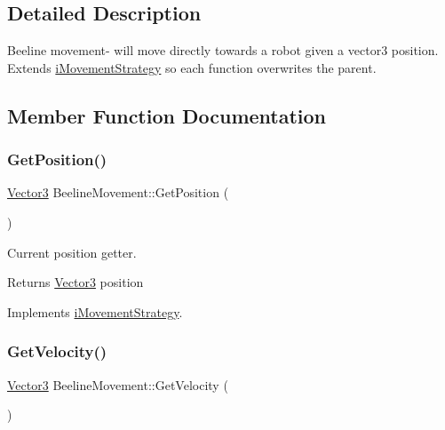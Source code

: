 \subsection{Detailed Description}
Beeline movement-\/ will move directly towards a robot given a vector3 position. Extends \hyperlink{classiMovementStrategy}{i\+Movement\+Strategy} so each function overwrites the parent. 

\subsection{Member Function Documentation}
\mbox{\label{classBeelineMovement_abfe070233bcdba668cd6f445b149f310}} 
\subsubsection{\texorpdfstring{Get\+Position()}{GetPosition()}}
{\footnotesize\ttfamily \hyperlink{classVector3}{Vector3} Beeline\+Movement\+::\+Get\+Position (\begin{DoxyParamCaption}{ }\end{DoxyParamCaption})\hspace{0.3cm}{\ttfamily [virtual]}}



Current position getter. 

\begin{DoxyReturn}{Returns}
\hyperlink{classVector3}{Vector3} position 
\end{DoxyReturn}


Implements \hyperlink{classiMovementStrategy_aa9f5a07461c654a7497775696d20e990}{i\+Movement\+Strategy}.

\mbox{\label{classBeelineMovement_a20adc01dabe57edd17128b81ec49661a}} 
\subsubsection{\texorpdfstring{Get\+Velocity()}{GetVelocity()}}
{\footnotesize\ttfamily \hyperlink{classVector3}{Vector3} Beeline\+Movement\+::\+Get\+Velocity (\begin{DoxyParamCaption}{ }\end{DoxyParamCaption})\hspace{0.3cm}{\ttfamily [virtual]}}



